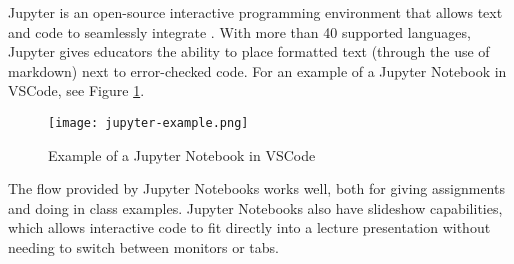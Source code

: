 Jupyter is an open-source interactive programming environment that allows text and code to 
seamlessly integrate \cite{jupyter}. With more than 40 supported languages, Jupyter gives educators the ability
to place formatted text (through the use of markdown) next to error-checked code. For an example
of a Jupyter Notebook in VSCode, see Figure \ref{fig:jupyter_example}.

\begin{figure}[h]
    \texttt{[image: jupyter-example.png]}
    \centering
    \caption{Example of a Jupyter Notebook in VSCode}
    \centering
    \label{fig:jupyter_example}
\end{figure}

The flow provided by Jupyter Notebooks works well, both for giving assignments and
doing in class examples. Jupyter Notebooks also have slideshow capabilities, which allows 
interactive code to fit directly into a lecture presentation without needing to switch between
monitors or tabs.
